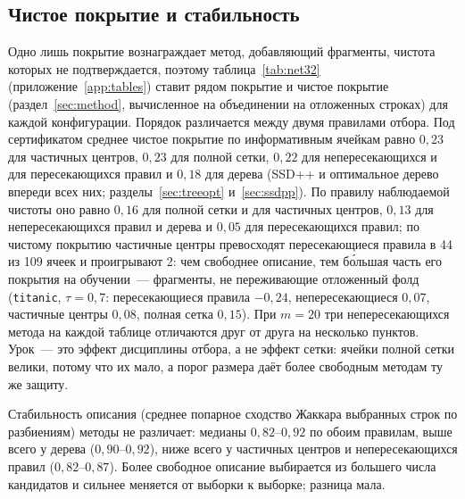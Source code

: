 \documentclass[11pt]{article}
\begin{document}
\subsection{Чистое покрытие и стабильность}\label{sec:net}

Одно лишь покрытие вознаграждает метод, добавляющий фрагменты, чистота которых не подтверждается, поэтому таблица~\ref{tab:net32} (приложение~\ref{app:tables}) ставит рядом покрытие и чистое покрытие (раздел~\ref{sec:method}, вычисленное на объединении на отложенных строках) для каждой конфигурации. Порядок различается между двумя правилами отбора. Под сертификатом среднее чистое покрытие по информативным ячейкам равно $0{,}23$ для частичных центров, $0{,}23$ для полной сетки, $0{,}22$ для непересекающихся и для пересекающихся правил и $0{,}18$ для дерева (SSD++ и оптимальное дерево впереди всех них; разделы~\ref{sec:treeopt} и~\ref{sec:ssdpp}). По правилу наблюдаемой чистоты оно равно $0{,}16$ для полной сетки и для частичных центров, $0{,}13$ для непересекающихся правил и дерева и $0{,}05$ для пересекающихся правил; по чистому покрытию частичные центры превосходят пересекающиеся правила в 44 из 109 ячеек и проигрывают 2: чем свободнее описание, тем бо́льшая часть его покрытия на обучении~--- фрагменты, не переживающие отложенный фолд (\texttt{titanic}, $\tau=0{,}7$: пересекающиеся правила $-0{,}24$, непересекающиеся $0{,}07$, частичные центры $0{,}08$, полная сетка $0{,}15$). При $m=20$ три непересекающихся метода на каждой таблице отличаются друг от друга на несколько пунктов. Урок~--- это эффект дисциплины отбора, а не эффект сетки: ячейки полной сетки велики, потому что их мало, а порог размера даёт более свободным методам ту же защиту.

Стабильность описания (среднее попарное сходство Жаккара выбранных строк по разбиениям) методы не различает: медианы $0{,}82$--$0{,}92$ по обоим правилам, выше всего у дерева ($0{,}90$--$0{,}92$), ниже всего у частичных центров и непересекающихся правил ($0{,}82$--$0{,}87$). Более свободное описание выбирается из большего числа кандидатов и сильнее меняется от выборки к выборке; разница мала.
\end{document}
